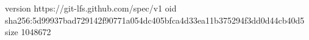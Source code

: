version https://git-lfs.github.com/spec/v1
oid sha256:5d99937bad729142f90771a054dc405bfca4d33ea11b375294f3dd0d44cb40d5
size 1048672
